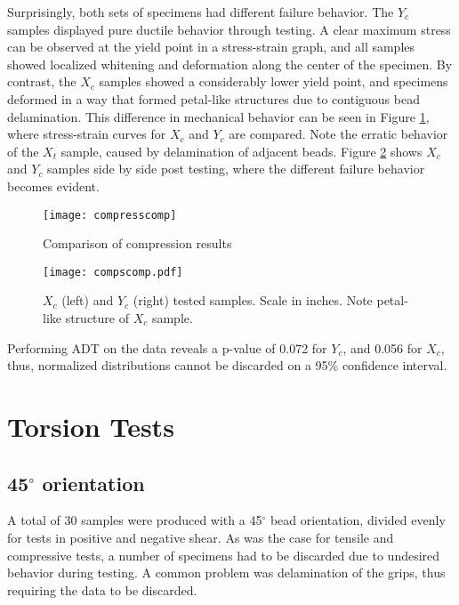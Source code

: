 \documentclass[main.tex]{subfiles}
\begin{document}
Surprisingly, both sets of specimens had different failure behavior. The $Y_c$ samples displayed pure ductile behavior through testing. A clear maximum stress can be observed at the yield point in a stress-strain graph, and all samples showed localized whitening and deformation along the center of the specimen. By contrast, the $X_c$ samples showed a considerably lower yield point, and specimens deformed in a way that formed petal-like structures due to contiguous bead delamination. This difference in mechanical behavior can be seen in Figure \ref{fig:comprComp}, where stress-strain curves for $X_c$ and $Y_c$ are compared. Note the erratic behavior of the $X_t$ sample, caused by delamination of adjacent beads. Figure \ref{fig:CompSComp} shows $X_c$ and $Y_c$ samples side by side post testing, where the different failure behavior becomes evident. 

\begin{figure}[!htbp]
	\center
	\texttt{[image: compresscomp]}
	\caption{Comparison of compression results} \label{fig:comprComp}
\end{figure}  

\begin{figure}[!htbp]
	\center
	\texttt{[image: compscomp.pdf]}
	\captionsetup{justification=centering} %
	\caption[$X_c$ and $Y_c$ tested samples]{$X_c$ (left) and $Y_c$ (right) tested samples. Scale in inches. Note petal-like structure of $X_c$ sample.} \label{fig:CompSComp}
\end{figure}

Performing ADT on the data reveals a p-value of 0.072 for $Y_c$, and 0.056 for $X_c$, thus, normalized distributions cannot be discarded on a 95\% confidence interval. %
\section{Torsion Tests} \label{sec:torsr}
\subsection{45$^\circ$ orientation} \label{ssec:45r}
A total of 30 samples were produced with a 45$^\circ$ bead orientation, divided evenly for tests in positive and negative shear. As was the case for tensile and compressive tests, a number of specimens had to be discarded due to undesired behavior during testing. A common problem was delamination of the grips, thus requiring the data to be discarded. 
\end{document}
